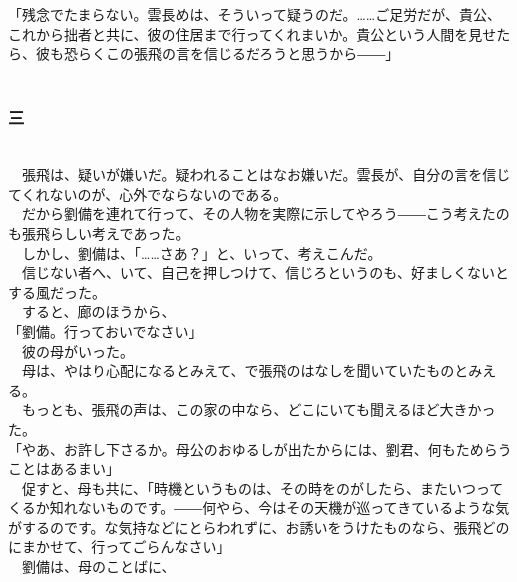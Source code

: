 \documentclass[
  paper=a5,
  fontsize=10pt,
  jafontsize=9.5pt,
  tate,                  %
  open_bracket_pos=nibu, %
]{jlreq}
\begin{document}
「残念でたまらない。雲長めは、そういって疑うのだ。……ご足労だが、貴公、これから拙者と共に、彼の住居まで行ってくれまいか。貴公という人間を見せたら、彼も恐らくこの張飛の言を信じるだろうと思うから――」\\

\\

\subsubsection{三}

\\


　張飛は、疑いが嫌いだ。疑われることはなお嫌いだ。雲長が、自分の言を信じてくれないのが、心外でならないのである。\\


　だから劉備を連れて行って、その人物を実際に示してやろう――こう考えたのも張飛らしい考えであった。\\


　しかし、劉備は、「……さあ？」と、いって、考えこんだ。\\


　信じない者へ、いて、自己を押しつけて、信じろというのも、好ましくないとする風だった。\\


　すると、廊のほうから、\\


「劉備。行っておいでなさい」\\


　彼の母がいった。\\


　母は、やはり心配になるとみえて、で張飛のはなしを聞いていたものとみえる。\\


　もっとも、張飛の声は、この家の中なら、どこにいても聞えるほど大きかった。\\


「やあ、お許し下さるか。母公のおゆるしが出たからには、劉君、何もためらうことはあるまい」\\


　促すと、母も共に、「時機というものは、その時をのがしたら、またいつってくるか知れないものです。――何やら、今はその天機が巡ってきているような気がするのです。な気持などにとらわれずに、お誘いをうけたものなら、張飛どのにまかせて、行ってごらんなさい」\\


　劉備は、母のことばに、\\
\end{document}
